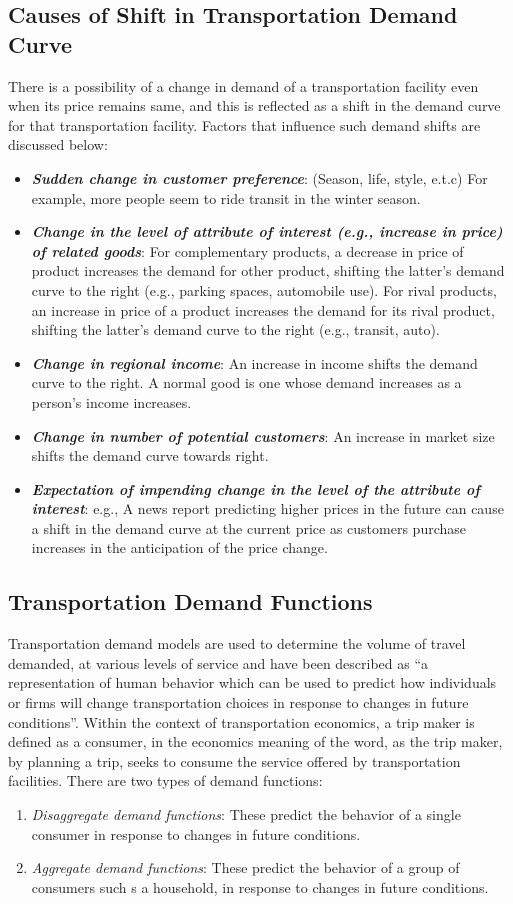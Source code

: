 \subsection{Causes of Shift in Transportation Demand Curve}
There is a possibility of a change in demand of a transportation facility even when its price remains same, and this is reflected as a shift in the demand curve for that transportation facility. Factors that influence such demand shifts are discussed below:
\begin{itemize}
	\item \textit{\textbf{Sudden change in customer preference}}: (Season, life, style, e.t.c) For example, more people seem to ride transit in the winter season.
	\item \textit{\textbf{Change in the level of attribute of interest (e.g., increase in price) of related goods}}: For complementary products, a decrease in price of product increases the demand for other product, shifting the latter's demand curve to the right (e.g., parking spaces, automobile use). For rival products, an increase in price of a product increases the demand for its rival product, shifting the latter's demand curve to the right (e.g., transit, auto).
	\item \textit{\textbf{Change in regional income}}: An increase in income shifts the demand curve to the right. A normal good is one whose demand increases as a person's income increases.
	\item \textit{\textbf{Change in number of potential customers}}: An increase in market size shifts the demand curve towards right.
	\item \textit{\textbf{Expectation of impending change in the level of the attribute of interest}}: e.g., A news report predicting higher prices in the future can cause a shift in the demand curve at the current price as customers purchase increases in the anticipation of the price change.
\end{itemize}
%
\subsection{Transportation Demand Functions}
Transportation demand models are used to determine the volume of travel demanded, at various levels of service and have been described as “a representation of human behavior which can be used to predict how individuals or firms will change transportation choices in response to changes in future conditions”. Within the context of transportation economics, a trip maker is defined as a consumer, in the economics meaning of the word, as the trip maker, by planning a trip, seeks to consume the service offered by transportation facilities. There are two types of demand functions:
\begin{enumerate}
	\item \textit{Disaggregate demand functions}: These predict the behavior of a single consumer in response to changes in future conditions.
	\item \textit{Aggregate demand functions}: These predict the behavior of a group of consumers such s a household, in response to changes in future conditions.
\end{enumerate}
